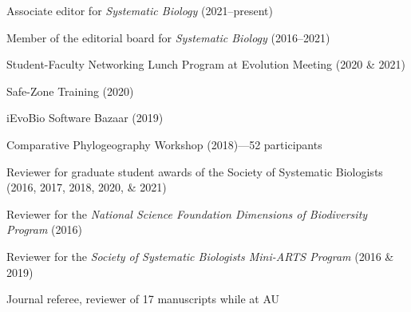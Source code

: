 \begin{veryTightItemize}
    \item Associate editor for \emph{Systematic Biology}
        (2021--present)
    \item Member of the editorial board for \emph{Systematic Biology}
        (2016--2021)
    \item Student-Faculty Networking Lunch Program at Evolution Meeting (2020 \& 2021)
    \item Safe-Zone Training (2020)
    \item iEvoBio Software Bazaar (2019)
    \item Comparative Phylogeography Workshop (2018)---52 participants
    \item Reviewer for graduate student awards of the Society of Systematic
        Biologists (2016, 2017, 2018, 2020, \& 2021)
    \item Reviewer for the \emph{National Science Foundation Dimensions of
            Biodiversity Program} (2016)
    \item Reviewer for the \emph{Society of Systematic Biologists Mini-ARTS
            Program} (2016 \& 2019)
    \item Journal referee, reviewer of 17 manuscripts while at AU
\end{veryTightItemize}
